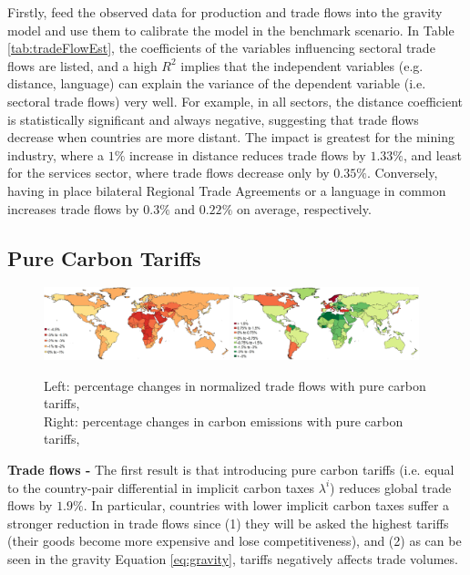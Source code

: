 Firstly, \textcite{Larch2017} feed the observed data for production and trade flows into the gravity model and use them to calibrate the model in the benchmark scenario. In Table \ref{tab:tradeFlowEst}, the coefficients of the variables influencing sectoral trade flows are listed, and a high $R^2$ implies that the independent variables (e.g. distance, language) can explain the variance of the dependent variable (i.e. sectoral trade flows) very well. For example, in all sectors, the distance coefficient is statistically significant and always negative, suggesting that trade flows decrease when countries are more distant. The impact is greatest for the mining industry, where a $1\%$ increase in distance reduces trade flows by $1.33\%$, and least for the services sector, where trade flows decrease only by $0.35\%$. Conversely, having in place bilateral Regional Trade Agreements or a language in common increases trade flows by $0.3\%$ and $0.22\%$ on average, respectively.

\subsection{Pure Carbon Tariffs}
\label{sec:purecarbontariffs}
\begin{figure}[h]
\captionsetup{singlelinecheck=false,font=small}
    \caption{Left: percentage changes in normalized trade flows with pure carbon tariffs,\\Right: percentage changes in carbon emissions with pure carbon tariffs, \textcite{Larch2017}}
    \label{img:purecarbontariffs}

\centering
    \includegraphics[width=0.48\textwidth]{img/A3-pure-tradeflows.jpg}
    \includegraphics[width=0.48\textwidth]{img/A5-pure-emissions.jpg}
    \label{meta-analysis}
\end{figure}
\textbf{Trade flows -} The first result is that introducing pure carbon tariffs (i.e. equal to the country-pair differential in implicit carbon taxes $\lambda^i$) reduces global trade flows by $1.9\%$. In particular, countries with lower implicit carbon taxes suffer a stronger reduction in trade flows since (1) they will be asked the highest tariffs (their goods become more expensive and lose competitiveness), and (2) as can be seen in the gravity Equation \ref{eq:gravity}, tariffs negatively affects trade volumes.

